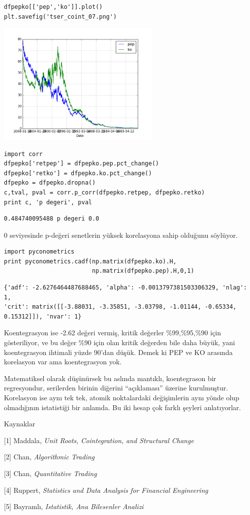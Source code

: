 \documentclass[12pt,fleqn]{article}\usepackage{../../common}
\begin{document}
\begin{verbatim}
dfpepko[['pep','ko']].plot()
plt.savefig('tser_coint_07.png')
\end{verbatim}

\includegraphics[height=6cm]{tser_coint_07.png}

\begin{verbatim}
import corr
dfpepko['retpep'] = dfpepko.pep.pct_change()
dfpepko['retko'] = dfpepko.ko.pct_change()
dfpepko = dfpepko.dropna()
c,tval, pval = corr.p_corr(dfpepko.retpep, dfpepko.retko)
print c, 'p degeri', pval
\end{verbatim}

\begin{verbatim}
0.484740095488 p degeri 0.0
\end{verbatim}

0 seviyesinde p-değeri senetlerin yüksek korelasyona sahip olduğunu
söylüyor. 

\begin{verbatim}
import pyconometrics
print pyconometrics.cadf(np.matrix(dfpepko.ko).H,
                         np.matrix(dfpepko.pep).H,0,1)
\end{verbatim}

\begin{verbatim}
{'adf': -2.6276464487688465, 'alpha': -0.0013797381503306329, 'nlag': 1,
'crit': matrix([[-3.88031, -3.35851, -3.03798, -1.01144, -0.65334,
0.15312]]), 'nvar': 1} 
\end{verbatim}

Koentegrasyon ise -2.62 değeri vermiş, kritik değerler \%99,\%95,\%90 için
gösteriliyor, ve bu değer \%90 için olan kritik değerden bile daha büyük,
yani koentegrasyon ihtimali yüzde 90'dan düşük. Demek ki PEP ve KO arasında
korelasyon var ama koentegrasyon yok.

Matematiksel olarak düşünürsek bu aslında mantıklı, koentegrason bir
regresyondur, serilerden birinin diğerini ``açıklaması'' üzerine
kurulmuştur. Korelasyon ise aynı tek tek, atomik noktalardaki değişimlerin
aynı yönde olup olmadığının istatistiği bir anlamda. Bu iki hesap çok
farklı şeyleri anlatıyorlar.

Kaynaklar 

[1] Maddala, {\em Unit Roots, Cointegration, and Structural Change}

[2] Chan, {\em Algorithmic Trading}

[3] Chan, {\em Quantitative Trading}

[4] Ruppert, {\em Statistics and Data Analysis for Financial Engineering}

[5] Bayramlı, {\em Istatistik, Ana Bilesenler Analizi}
\end{document}
